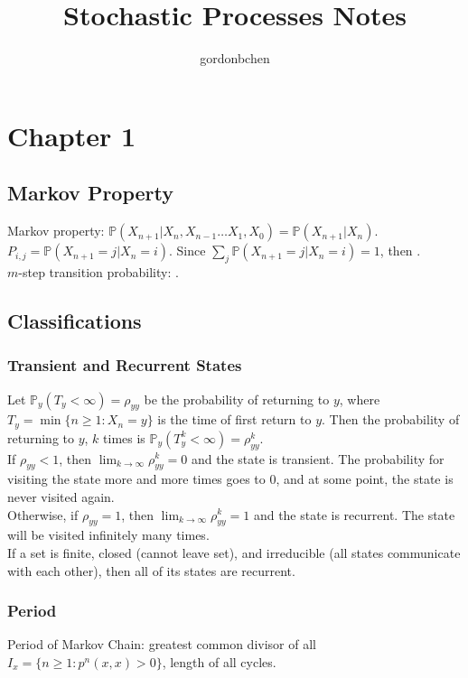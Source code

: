 \documentclass{article}
\title{Stochastic Processes Notes}
\author{gordonbchen}
\begin{document}
\date{}
\maketitle


\section{Chapter 1}
\subsection{Markov Property}
Markov property: $\boxed{\mathbb{P}(X_{n+1} | X_n, X_{n-1} \dots X_1, X_0) = \mathbb{P}(X_{n+1} | X_n)}$. \\

$P_{i,j} = \mathbb{P}(X_{n+1}=j | X_n=i)$. Since $\sum_j \mathbb{P}(X_{n+1}=j | X_n=i) = 1$, then . \\

$m$-step transition probability: .


\subsection{Classifications}
\subsubsection{Transient and Recurrent States}
Let $\mathbb{P}_y(T_y < \infty) = \rho_{yy}$ be the probability of returning to $y$, where $T_y = \min\{n \ge 1: X_n = y\}$ is the time of first return to $y$. Then the probability of returning to $y$, $k$ times is $\mathbb{P}_y(T^k_y < \infty) = \rho_{yy}^k$. \\

If $\rho_{yy} < 1$, then $\lim_{k\to\infty} \rho^k_{yy} = 0$ and the state is transient. The probability for visiting the state more and more times goes to 0, and at some point, the state is never visited again. \\

Otherwise, if $\rho_{yy} = 1$, then $\lim_{k\to\infty} \rho^k_{yy} = 1$ and the state is recurrent. The state will be visited infinitely many times. \\

If a set is finite, closed (cannot leave set), and irreducible (all states communicate with each other), then all of its states are recurrent.

\subsubsection{Period}
Period of Markov Chain: greatest common divisor of all $I_x = \{n \ge 1: p^n(x, x) > 0\}$, length of all cycles. \\
\end{document}
